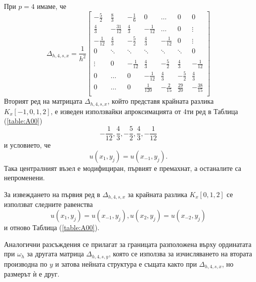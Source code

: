 \documentclass{article}
\newcommand{\rf}[1]{(\ref{#1})}
\begin{document}
При $p=4$ имаме, че 
\[
\Delta_{h,4,s,x} = \frac{1}{h^2}
\begin{bmatrix}
     -\frac{5}{2}	& \frac{8}{3}       & -\frac{1}{6}	&    0     			&    \dots      	   &   0           & 0    \\
    \frac{4}{3}          &-\frac{31}{12}    	& \frac{4}{3}	&   -\frac{1}{12}	  	&   \dots      	  &   0	           & \vdots  \\
    -\frac{1}{12}	& \frac{4}{3}         	& -\frac{5}{2}	&  \frac{4}{3}    	 &   -\frac{1}{12}	  &      0           &\vdots    \\
        0           		& \ddots        	&    \ddots   		 &   \ddots      	 &     \ddots      	  &  \ddots        &    0 \\	
\\
   \vdots      		 & 0           		 &  -\frac{1}{12}	& \frac{4}{3}    	& -\frac{5}{2}	&  \frac{4}{3}   &   -\frac{1}{12} \\
    0      		 &  \dots           	 &   0     		& -\frac{1}{12} 	 & \frac{4}{3} 	 & -\frac{5}{2}  &  \frac{4}{3}\\
    0              		 & \dots          	&  0              		 &\frac{1}{120} 	 &  -\frac{2}{15} 	& \frac{29}{20} & -\frac{38}{15}\\
\end{bmatrix}
\]
Вторият ред на матрицата $\Delta_{h,4,s,x}$, който представя крайната разлика $K_x[-1,0,1,2]$, е изведен използвайки апроксимацията от 4ти ред в Таблица \rf{table:A00}
$$ -\frac{1}{12}, \frac{4}{3}, -\frac{5}{2},  \frac{4}{3}, -\frac{1}{12} $$ и условието, че
$$u(x_1, y_j) = u(x_{-1}, y_j).$$
Така централният възел е модифициран, първият е премахнат, а останалите са непроменени. 

За извеждането на първия ред в $\Delta_{h,4,s,x}$ за крайната разлика $K_x[0,1,2]$ се използват следните равенства
$$u(x_1, y_j) = u(x_{-1}, y_j), u(x_2, y_j) = u(x_{-2}, y_j)$$
и отново Таблица \rf{table:A00}.

Аналогични разсъждения се прилагат за границата разположена върху ординатата при $\omega_h$ за другата матрица $\Delta_{h,4,s,y}$, която се използва за изчисляването на втората производна по $y$ и затова нейната структура е същата както при $\Delta_{h,4,s,x}$, но размерът ѝ е друг.
\end{document}
